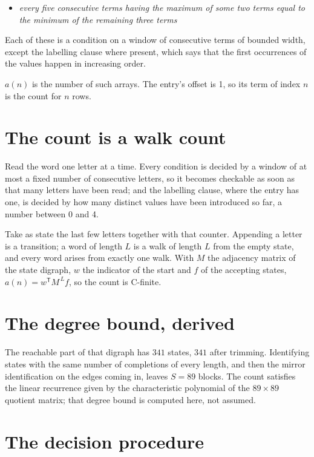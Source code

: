 \documentclass[11pt]{article}
\theoremstyle{definition}
\begin{document}
\begin{itemize}

\item {\itshape every five consecutive terms having the maximum of some two terms equal to the minimum of the remaining three terms}

\end{itemize}

Each of these is a condition on a window of consecutive terms of bounded width, except the labelling clause where present, which says that the first occurrences of the values happen in increasing order.

$a(n)$ is the number of such arrays. The entry's offset is 1, so its term of index $n$ is the count for $n$ rows.

\section{The count is a walk count}

Read the word one letter at a time. Every condition is decided by a window of at most a fixed number of consecutive letters, so it becomes checkable as soon as that many letters have been read; and the labelling clause, where the entry has one, is decided by how many distinct values have been introduced so far, a number between $0$ and 4.

Take as state the last few letters together with that counter. Appending a letter is a transition; a word of length $L$ is a walk of length $L$ from the empty state, and every word arises from exactly one walk. With $M$ the adjacency matrix of the state digraph, $w$ the indicator of the start and $f$ of the accepting states, $a(n) = w^{\mathsf T}M^{\,L}f$, so the count is C-finite.

\section{The degree bound, derived}

The reachable part of that digraph has $341$ states, $341$ after trimming. Identifying states with the same number of completions of every length, and then the mirror identification on the edges coming in, leaves $S = 89$ blocks. The count satisfies the linear recurrence given by the characteristic polynomial of the $89\times89$ quotient matrix; that degree bound is computed here, not assumed.

\section{The decision procedure}
\end{document}

